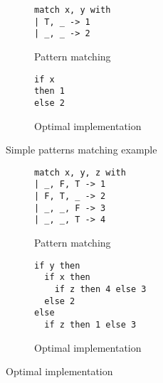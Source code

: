 
\begin{figure*}[t!]
  \begin{subfigure}[t]{0.48\textwidth}
    \centering
    \begin{subfigure}{0.4\linewidth}
      \centering
      \renewcommand\thesubfigure{\alph{subfigure}1}
      \begin{lstlisting}[xleftmargin=.7cm,linewidth=3.5cm]
match x, y with
| T, _ -> 1
| _, _ -> 2
      \end{lstlisting}
      \caption{Pattern matching}
      \label{fig:match-example-small-functional}
    \end{subfigure}
    \hspace{.5cm}
    \begin{subfigure}{0.5\linewidth}
      \centering
      \addtocounter{subfigure}{-1}
      \renewcommand\thesubfigure{\alph{subfigure}2}
      \begin{lstlisting}[xleftmargin=1.7cm,linewidth=3.5cm]
if x 
then 1 
else 2
      \end{lstlisting}
      \caption{Optimal implementation}
    \end{subfigure}
    \addtocounter{subfigure}{-1}
    \caption{Simple patterns matching example} 
    \label{fig:match-example-small}
  \end{subfigure}
  \begin{subfigure}[t]{0.48\textwidth}
    \begin{subfigure}{0.4\linewidth}
      \centering
      \renewcommand\thesubfigure{\alph{subfigure}1}
      \begin{lstlisting}
match x, y, z with
| _, F, T -> 1
| F, T, _ -> 2
| _, _, F -> 3
| _, _, T -> 4
      \end{lstlisting}
      \vskip4.5mm
      \caption{Pattern matching}
      \label{fig:matching-example1}
    \end{subfigure}
    \begin{subfigure}{0.5\linewidth}
      \centering
      \addtocounter{subfigure}{-1}
      \renewcommand\thesubfigure{\alph{subfigure}2}
      \begin{lstlisting}
if y then
  if x then
    if z then 4 else 3
  else 2
else
  if z then 1 else 3
      \end{lstlisting}
      \caption{Optimal implementation}

\end{subfigure}
\end{subfigure}
\end{figure*}
